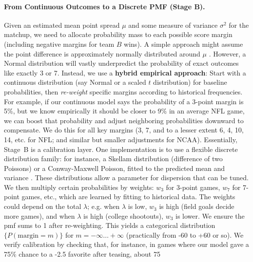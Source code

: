 \documentclass[12pt]{article}
\begin{document}
\paragraph{From Continuous Outcomes to a Discrete PMF (Stage B).} Given an estimated mean point spread $\mu$ and some measure of variance $\sigma^2$ for the matchup, we need to allocate probability mass to each possible score margin (including negative margins for team $B$ wins). A simple approach might assume the point difference is approximately normally distributed around $\mu$ \cite{Stern1991}. However, a Normal distribution will vastly underpredict the probability of exact outcomes like exactly 3 or 7. Instead, we use a \textbf{hybrid empirical approach}: Start with a continuous distribution (say Normal or a scaled $t$ distribution) for baseline probabilities, then \emph{re-weight} specific margins according to historical frequencies. For example, if our continuous model says the probability of a 3-point margin is 5\%, but we know empirically it should be closer to 9\% in an average NFL game, we can boost that probability and adjust neighboring probabilities downward to compensate. We do this for all key margins (3, 7, and to a lesser extent 6, 4, 10, 14, etc. for NFL; and similar but smaller adjustments for NCAA). Essentially, Stage~B is a calibration layer. One implementation is to use a flexible discrete distribution family: for instance, a Skellam distribution (difference of two Poissons) or a Conway-Maxwell Poisson, fitted to the predicted mean and variance \cite{Baker2013}. These distributions allow a parameter for dispersion that can be tuned. We then multiply certain probabilities by weights: $w_3$ for 3-point games, $w_7$ for 7-point games, etc., which are learned by fitting to historical data. The weights could depend on the total $\lambda$; e.g. when $\lambda$ is low, $w_3$ is high (field goals decide more games), and when $\lambda$ is high (college shootouts), $w_3$ is lower. We ensure the pmf sums to 1 after re-weighting. This yields a categorical distribution $\{P(\text{margin}=m)\}$ for $m = -\infty\ldots +\infty$ (practically from -60 to +60 or so). We verify calibration by checking that, for instance, in games where our model gave a 75\% chance to a -2.5 favorite after teasing, about 75%
\end{document}
